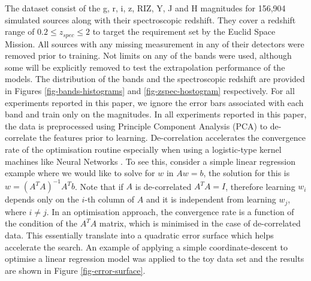 \documentclass[useAMS,usenatbib,fleqn]{mn2e}
\begin{document}
The dataset consist of the g, r, i, z, RIZ, Y, J and H magnitudes for 156,904 simulated sources along with their spectroscopic redshift. They cover a redshift range of $0.2 \le z_{spec} \le 2$ to target the requirement set by the Euclid Space Mission. All sources with any missing measurement in any of their detectors were removed prior to training. Not limits on any of the bands were used, although some will be explicitly removed to test the extrapolation performance of the models. The distribution of the bands and the spectroscopic redshift are provided in Figures \ref{fig-bands-histograms} and \ref{fig-zspec-hostogram} respectively. For all experiments reported in this paper, we ignore the error bars associated with each band and train only on the magnitudes. In all experiments reported in this paper, the data is preprocessed using Principle Component Analysis (PCA) \citep{jolliffe1986} to de-correlate the features prior to learning. De-correlation accelerates the convergence rate of the optimisation routine especially when using a logistic-type kernel machines like Neural Networks \citep{lecun1998}. To see this, consider a simple linear regression example where we would like to solve for $w$ in $Aw=b$, the solution for this is $w=\left(A^{T}A\right)^{-1}A^{T}b$. Note that if $A$ is de-correlated $A^{T}A=I$, therefore learning $w_{i}$ depends only on the $i$-th column of $A$ and it is independent from learning $w_{j}$, where $i\ne j$. In an optimisation approach, the convergence rate is a function of the condition of the $A^{T}A$ matrix, which is minimised in the case of de-correlated data. This essentially translate into a quadratic error surface which helps accelerate the search. An example of applying a simple coordinate-descent to optimise a linear regression model was applied to the toy data set and the results are shown in Figure \ref{fig-error-surface}.
\end{document}
